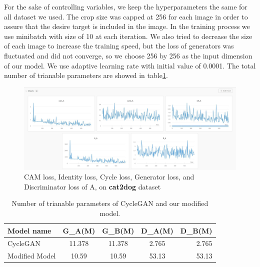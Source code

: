 \documentclass{article}
\begin{document}
For the sake of controlling variables, we keep the hyperparameters the same for all dataset we used. The crop size was capped at 256 for each image in order to assure that the desire target is included in the image. In the training process we use minibatch with size of 10 at each iteration. We also tried to decrease the size of each image to increase the training speed, but the loss of generators was fluctuated and did not converge, so we choose 256 by 256 as the input dimension of our model. We use adaptive learning rate with initial value of 0.0001. The total number of trianable parameters are showed in table\ref{tab:parameters}. 


\begin{figure}[tb]
\begin{center}
\centerline{\includegraphics[width=2\columnwidth]{Images/loss.pdf}}
\caption{CAM loss, Identity loss, Cycle loss, Generator loss, and Discriminator loss of A, on \textbf{cat2dog} dataset}
\label{fig:loss}
\end{center}
\end{figure} 

\begin{table}[tb]
\vskip 3mm
\begin{center}
\begin{small}
\begin{sc}
\begin{tabular}{lcccr}
\hline
Model name & G\_A(M) & G\_B(M) & D\_A(M) & D\_B(M) \\
\hline
CycleGAN    & 11.378 & 11.378 & 2.765 & 2.765 \\
Modified Model & 10.59 & 10.59 & 53.13 & 53.13\\
\hline
\end{tabular}
\end{sc}
\caption{Number of trianable parameters of CycleGAN and our modified model.}
\label{tab:parameters}
\end{small}
\end{center}
\vskip -3mm
\end{table}
\end{document}
